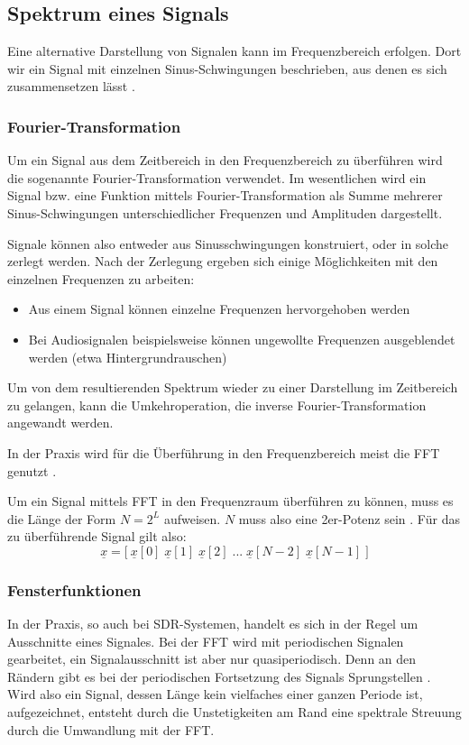 \subsection{Spektrum eines Signals}
Eine alternative Darstellung von Signalen kann im Frequenzbereich erfolgen. Dort wir ein Signal mit einzelnen Sinus-Schwingungen beschrieben, aus denen es sich zusammensetzen lässt \cite[vgl. Karrenberg, S. 42]{Karrenberg:2017}.

\subsubsection{Fourier-Transformation}
Um ein Signal aus dem Zeitbereich in den Frequenzbereich zu überführen wird die sogenannte Fourier-Transformation verwendet.\newline
Im wesentlichen wird ein Signal bzw. eine Funktion mittels Fourier-Transformation als Summe mehrerer Sinus-Schwingungen unterschiedlicher Frequenzen und Amplituden dargestellt.

Signale können also entweder aus Sinusschwingungen konstruiert, oder in solche zerlegt werden.
Nach der Zerlegung ergeben sich einige Möglichkeiten mit den einzelnen Frequenzen zu arbeiten:
\begin{itemize}
	\item Aus einem Signal können einzelne Frequenzen hervorgehoben werden
	\item Bei Audiosignalen beispielsweise können ungewollte Frequenzen ausgeblendet werden (etwa Hintergrundrauschen)
\end{itemize}

Um von dem resultierenden Spektrum wieder zu einer Darstellung im Zeitbereich zu gelangen, kann die Umkehroperation, die inverse Fourier-Transformation angewandt werden.

In der Praxis wird für die Überführung in den Frequenzbereich meist die \ac{FFT} genutzt \cite[vgl. Heuberger, e. a., S. 14]{Heuberger:2017}.

Um ein Signal mittels \ac{FFT} in den Frequenzraum überführen zu können, muss es die Länge der Form \(N = 2^L\) aufweisen. \(N\) muss also eine 2er-Potenz sein \cite[vgl. Heuberger, e. a., S. 15]{Heuberger:2017}.
Für das zu überführende Signal gilt also:
\[\underline{x} = \Big[ \:  \underline{x}[0] \; \underline{x}[1] \; \underline{x}[2] \; ... \; \underline{x}[N - 2] \; \underline{x}[N - 1] \; \Big] \]

\subsubsection{Fensterfunktionen}
In der Praxis, so auch bei \ac{SDR}-Systemen, handelt es sich in der Regel um Ausschnitte eines Signales. Bei der \ac{FFT} wird mit periodischen Signalen gearbeitet, ein Signalausschnitt ist aber nur quasiperiodisch. Denn an den Rändern gibt es bei der periodischen Fortsetzung des Signals Sprungstellen \cite[vgl. Meyer, S. 187]{Meyer:2017}.\newline
Wird also ein Signal, dessen Länge kein vielfaches einer ganzen Periode ist, aufgezeichnet, entsteht durch die Unstetigkeiten am Rand eine spektrale Streuung durch die Umwandlung mit der \ac{FFT}.

